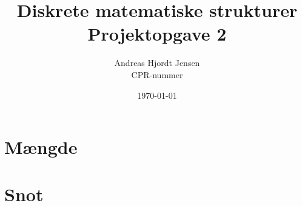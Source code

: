 \documentclass{article}
\title{Diskrete matematiske strukturer\\ 
          Projektopgave 2}
\author{
          Andreas Hjordt Jensen \\
          CPR-nummer\\
}
\date{\today}
\begin{document}
\maketitle
\clearpage
\section{M{\ae}ngde}
\section{Snot}
\end{document}
